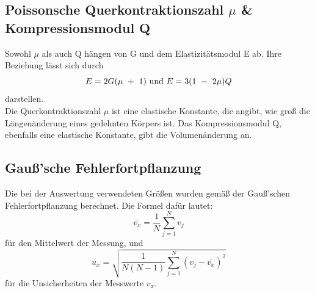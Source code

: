 \subsection{Poissonsche Querkontraktionszahl \texorpdfstring{$\mu$}{mu} \& Kompressionsmodul Q}
Sowohl $\mu$ als auch Q hängen von G und dem Elastizitätsmodul E ab.
Ihre Beziehung lässt sich durch
\begin{equation}
    E = 2G(\mu\ +\ 1)\\
    \
    \textrm{und}\\
    \
    E = 3(1\ -\ 2\mu)Q
\end{equation}
darstellen.\\
Die Querkontraktionszahl $\mu$ ist eine elastische Konstante, die angibt, wie groß die Längenänderung eines gedehnten Körpers ist.
Das Kompressionsmodul Q, ebenfalls eine elastische Konstante, gibt die Volumenänderung an.\\
\subsection{Gauß'sche Fehlerfortpflanzung}
Die bei der Auswertung verwendeten Größen wurden gemäß der Gauß'schen Fehlerfortpflanzung berechnet.
Die Formel dafür lautet:
\begin{equation}
    \overline{v_x}=\frac{1}{N} \sum_{j=1}^N v_j
\end{equation}
für den Mittelwert der Messung, und
\begin{equation}
    u_x = \sqrt{\frac{1}{N(N-1)} \sum_{j=1}^N (v_j-\overline{v_x})^2}
\end{equation}
für die Unsicherheiten der Messwerte $v_x$.